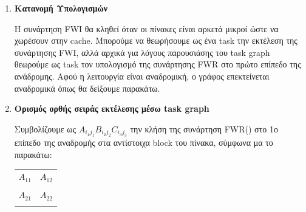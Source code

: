 \documentclass{article}
\begin{document}
\begin{enumerate}
\item \textbf{Κατανομή Υπολογισμών}

Η συνάρτηση FWI θα κληθεί όταν οι πίνακες είναι αρκετά μικροί ώστε να χωρέσουν στην cache. Μπορούμε να θεωρήσουμε ως ένα task την εκτέλεση της συνάρτησης FWI, αλλά αρχικά για λόγους παρουσιάσης του task graph θεωρούμε ως task τον υπολογισμό της συνάρτησης FWR στο πρώτο επίπεδο της ανάδρομης. Αφού η λειτουργία είναι αναδρομική, ο γράφος επεκτείνεται αναδρομικά όπως θα δείξουμε παρακάτω.

\item \textbf{Ορισμός ορθής σειράς εκτέλεσης μέσω task graph}

Συμβολίζουμε ως $A_{i_1j_1}B_{i_2j_2}C_{i_3j_3}$ την κλήση της συνάρτηση FWR() στο 1ο επίπεδο της αναδρομής στα αντίστοιχα block του πίνακα, σύμφωνα μα το παρακάτω:

\begin{center}
 \begin{tabular}{|c  c | c  c|} 
 \hline
   \multicolumn{2}{|c|}{$A_{11}$} &    \multicolumn{2}{c|}{$A_{12}$} \\ 
   &&& \\
 \hline
   \multicolumn{2}{|c|}{$A_{21}$} &    \multicolumn{2}{c|}{$A_{22}$} \\ 
   &&& \\
 \hline
\end{tabular}
\end{center}

\begin{center}
\end{center}
\end{enumerate}
\end{document}
